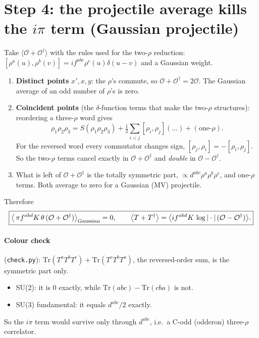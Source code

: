 \documentclass[10pt]{article}
\numberwithin{equation}{section}
\begin{document}
\section{Step 4: the projectile average kills the $i\pi$ term (Gaussian projectile)}
Take $\langle\mathcal O+\mathcal O^\dagger\rangle$ with the rules used for the two-$\rho$ reduction: $[\rho^a(u),\rho^b(v)]=if^{abc}\rho^c(u)\delta(u-v)$ and a Gaussian weight.
\begin{enumerate}
\item \textbf{Distinct points} $x',x,y$: the $\rho$'s commute, so $\mathcal O+\mathcal O^\dagger=2\mathcal O$. The Gaussian average of an odd number of $\rho$'s is zero.
\item \textbf{Coincident points} (the $\delta$-function terms that make the two-$\rho$ structures): reordering a three-$\rho$ word gives
\begin{equation*}
\rho_1\rho_2\rho_3=S(\rho_1\rho_2\rho_3)+\tfrac12\sum_{i<j}[\rho_i,\rho_j](\dots)+(\text{one-}\rho).
\end{equation*}
For the reversed word every commutator changes sign, $[\rho_j,\rho_i]=-[\rho_i,\rho_j]$. So the two-$\rho$ terms cancel exactly in $\mathcal O+\mathcal O^\dagger$ and \emph{double} in $\mathcal O-\mathcal O^\dagger$.
\item What is left of $\mathcal O+\mathcal O^\dagger$ is the totally symmetric part, $\propto d^{abc}\rho^a\rho^b\rho^c$, and one-$\rho$ terms. Both average to zero for a Gaussian (MV) projectile.
\end{enumerate}
Therefore
\begin{equation}
\boxed{\big\langle\,\pi f^{abd}K\,\theta\,(\mathcal O+\mathcal O^\dagger)\big\rangle_{\rm Gaussian}=0,\qquad\big\langle T+T^\dagger\big\rangle=\big\langle i f^{abd}K\,\log|\cdot|\,(\mathcal O-\mathcal O^\dagger)\big\rangle .}
\end{equation}
\paragraph{Colour check} (\texttt{check.py}): $\mathrm{Tr}(T^aT^bT^c)+\mathrm{Tr}(T^cT^bT^a)$, the reversed-order sum, is the symmetric part only.
\begin{itemize}
\item SU(2): it is 0 exactly, while $\mathrm{Tr}(abc)-\mathrm{Tr}(cba)$ is not.
\item SU(3) fundamental: it equals $d^{abc}/2$ exactly.
\end{itemize}
So the $i\pi$ term would survive only through $d^{abc}$, i.e.\ a C-odd (odderon) three-$\rho$ correlator.
\end{document}

